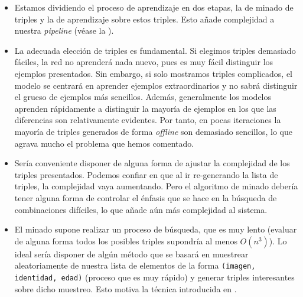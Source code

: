 \begin{itemize}
	\item Estamos dividiendo el proceso de aprendizaje en dos etapas, la de minado de triples y la de aprendizaje sobre estos triples. Esto añade complejidad a nuestra \textit{pipeline} (véase la ).
	\item La adecuada elección de triples es fundamental. Si elegimos triples demasiado fáciles, la red no aprenderá nada nuevo, pues es muy fácil distinguir los ejemplos presentados. Sin embargo, si solo mostramos triples complicados, el modelo se centrará en aprender ejemplos extraordinarios y no sabrá distinguir el grueso de ejemplos más sencillos. Además, generalmente los modelos aprenden rápidamente a distinguir la mayoría de ejemplos en los que las diferencias son relativamente evidentes. Por tanto, en pocas iteraciones la mayoría de triples generados de forma \textit{offline} son demasiado sencillos, lo que agrava mucho el problema que hemos comentado.
	\item Sería conveniente disponer de alguna forma de ajustar la complejidad de los triples presentados. Podemos confiar en que al ir re-generando la lista de triples, la complejidad vaya aumentando. Pero el algoritmo de minado debería tener alguna forma de controlar el énfasis que se hace en la búsqueda de combinaciones difíciles, lo que añade aún más complejidad al sistema.
	\item El minado supone realizar un proceso de búsqueda, que es muy lento (evaluar de alguna forma todos los posibles triples supondría al menos $O(n^3)$). Lo ideal sería disponer de algún método que se basará en muestrear aleatoriamente de nuestra lista de elementos de la forma \lstinline{(imagen, identidad, edad)} (proceso que es muy rápido) y generar triples interesantes sobre dicho muestreo. Esto motiva la técnica introducida en .
\end{itemize}
